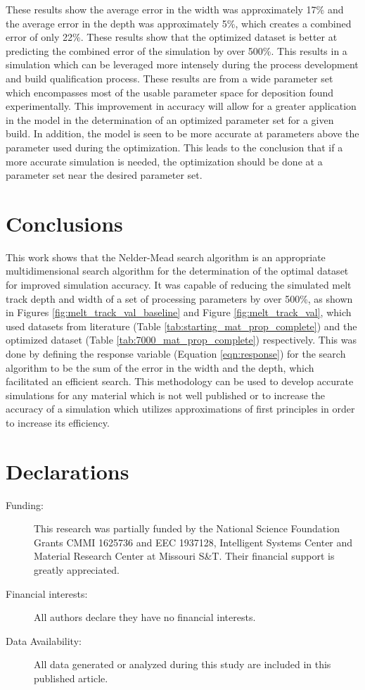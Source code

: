 \documentclass[pdflatex,sn-mathphys]{sn-jnl}
\begin{document}
	These results show the average error in the width was approximately 17\% and the average error in the depth was approximately 5\%, which creates a combined error of only 22\%.  These results show that the optimized dataset is better at predicting the combined error of the simulation by over 500\%.  This results in a simulation which can be leveraged more intensely during the process development and build qualification process.  
	These results are from a wide parameter set which encompasses most of the usable parameter space for deposition found experimentally.  This improvement in accuracy will allow for a greater application in the model in the determination of an optimized parameter set for a given build.  In addition, the model is seen to be more accurate at parameters above the parameter used during the optimization.  This leads to the conclusion that if a more accurate simulation is needed, the optimization should be done at a parameter set near the desired parameter set.
	\FloatBarrier

\section{Conclusions}
	\label{conclusions}

	This work shows that the Nelder-Mead search algorithm is an appropriate multidimensional search algorithm for the determination of the optimal dataset for improved simulation accuracy.  It was capable of reducing the simulated melt track depth and width of a set of processing parameters by over 500\%, as shown in Figures \ref{fig:melt_track_val_baseline} and Figure \ref{fig:melt_track_val}, which used datasets from literature (Table \ref{tab:starting_mat_prop_complete}) and the optimized dataset (Table \ref{tab:7000_mat_prop_complete}) respectively.  This was done by defining the response variable (Equation \ref{eqn:response}) for the search algorithm to be the sum of the error in the width and the depth, which facilitated an efficient search.  
	This methodology can be used to develop accurate simulations for any material which is not well published or to increase the accuracy of a simulation which utilizes approximations of first principles in order to increase its efficiency.


\section{Declarations}
\begin{description}
	\item[Funding:] This research was partially funded by the National Science Foundation Grants CMMI 1625736 and EEC 1937128, Intelligent Systems Center and Material Research Center at Missouri S\&T. Their financial support is greatly appreciated.
	\item[Financial interests:] All authors declare they have no financial interests.
	\item[Data Availability:] All data generated or analyzed during this study are included in this published article.
\end{description}



\end{document}
